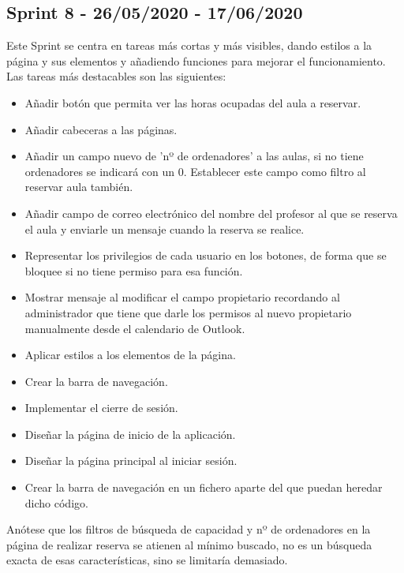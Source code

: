 \subsection{Sprint 8 - 26/05/2020 - 17/06/2020}
Este Sprint se centra en tareas más cortas y más visibles, dando estilos a la página y sus elementos y añadiendo funciones para mejorar el funcionamiento. Las tareas más destacables son las siguientes:
\begin{itemize}
    \item Añadir botón que permita ver las horas ocupadas del aula a reservar.
    \item Añadir cabeceras a las páginas.
    \item Añadir un campo nuevo de 'nº de ordenadores' a las aulas, si no tiene ordenadores se indicará con un 0. Establecer este campo como filtro al reservar aula también.
    \item Añadir campo de correo electrónico del nombre del profesor al que se reserva el aula y enviarle un mensaje cuando la reserva se realice.
    \item Representar los privilegios de cada usuario en los botones, de forma que se bloquee si no tiene permiso para esa función.
    \item Mostrar mensaje al modificar el campo propietario recordando al administrador que tiene que darle los permisos al nuevo propietario manualmente desde el calendario de Outlook.
    \item Aplicar estilos a los elementos de la página.
    \item Crear la barra de navegación.
    \item Implementar el cierre de sesión.
    \item Diseñar la página de inicio de la aplicación.
    \item Diseñar la página principal al iniciar sesión.
    \item Crear la barra de navegación en un fichero aparte del que puedan heredar dicho código.
\end{itemize}
Anótese que los filtros de búsqueda de capacidad y nº de ordenadores en la página de realizar reserva se atienen al mínimo buscado, no es un búsqueda exacta de esas características, sino se limitaría demasiado.

